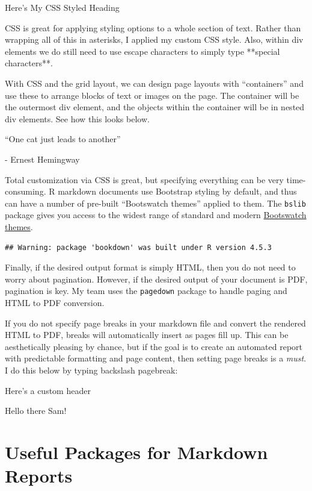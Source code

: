 \documentclass[
]{article}
\begin{document}
Here's My CSS Styled Heading

CSS is great for applying styling options to a whole section of text.
Rather than wrapping all of this in asterisks, I applied my custom CSS
style. Also, within div elements we do still need to use escape
characters to simply type **special characters**.

With CSS and the grid layout, we can design page layouts with
``containers'' and use these to arrange blocks of text or images on the
page. The container will be the outermost div element, and the objects
within the container will be in nested div elements. See how this looks
below.

``One cat just leads to another''

- Ernest Hemingway

Total customization via CSS is great, but specifying everything can be
very time-consuming. R markdown documents use Bootstrap styling by
default, and thus can have a number of pre-built ``Bootswatch themes''
applied to them. The \texttt{bslib} package gives you access to the
widest range of standard and modern
\href{https://bootswatch.com/}{Bootswatch themes}.

\begin{verbatim}
## Warning: package 'bookdown' was built under R version 4.5.3
\end{verbatim}

Finally, if the desired output format is simply HTML, then you do not
need to worry about pagination. However, if the desired output of your
document is PDF, pagination is key. My team uses the \texttt{pagedown}
package to handle paging and HTML to PDF conversion.

If you do not specify page breaks in your markdown file and convert the
rendered HTML to PDF, breaks will automatically insert as pages fill up.
This can be aesthetically pleasing by chance, but if the goal is to
create an automated report with predictable formatting and page content,
then setting page breaks is a \emph{must}. I do this below by typing
backslash pagebreak:

\pagebreak

Here's a custom header

Hello there Sam!

\section{Useful Packages for Markdown
Reports}\label{useful-packages-for-markdown-reports}
\end{document}
